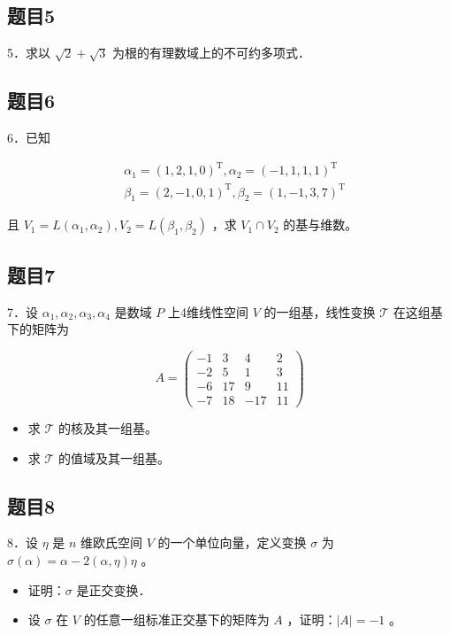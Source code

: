 \documentclass{article}
\begin{document}
\subsection{题目5}
5．求以 \(\sqrt{2}+\sqrt{3}\) 为根的有理数域上的不可约多项式．

\subsection{题目6}
6．已知

\[
\begin{aligned}
& \alpha_{1}=(1,2,1,0)^{\mathrm{T}}, \alpha_{2}=(-1,1,1,1)^{\mathrm{T}} \\
& \beta_{1}=(2,-1,0,1)^{\mathrm{T}}, \beta_{2}=(1,-1,3,7)^{\mathrm{T}}
\end{aligned}
\]

且 \(V_{1}=L\left(\alpha_{1}, \alpha_{2}\right), V_{2}=L\left(\beta_{1}, \beta_{2}\right)\) ，求 \(V_{1} \cap V_{2}\) 的基与维数。

\subsection{题目7}
7．设 \(\alpha_{1}, \alpha_{2}, \alpha_{3}, \alpha_{4}\) 是数域 \(P\) 上4维线性空间 \(V\) 的一组基，线性变换 \(\mathcal{T}\) 在这组基下的矩阵为

\[
A=\left(\begin{array}{cccc}
-1 & 3 & 4 & 2 \\
-2 & 5 & 1 & 3 \\
-6 & 17 & 9 & 11 \\
-7 & 18 & -17 & 11
\end{array}\right)
\]

\begin{itemize}
  \item[（1）] 求 \(\mathcal{T}\) 的核及其一组基。
  \item[（2）] 求 \(\mathcal{T}\) 的值域及其一组基。
\end{itemize}

\subsection{题目8}
8．设 \(\eta\) 是 \(n\) 维欧氏空间 \(V\) 的一个单位向量，定义变换 \(\sigma\) 为 \(\sigma(\alpha)=\alpha-2(\alpha, \eta) \eta\) 。

\begin{itemize}
  \item[（1）] 证明：\(\sigma\) 是正交变换．
  \item[（2）] 设 \(\sigma\) 在 \(V\) 的任意一组标准正交基下的矩阵为 \(A\) ，证明：\(|A|=-1\) 。
\end{itemize}
\end{document}
